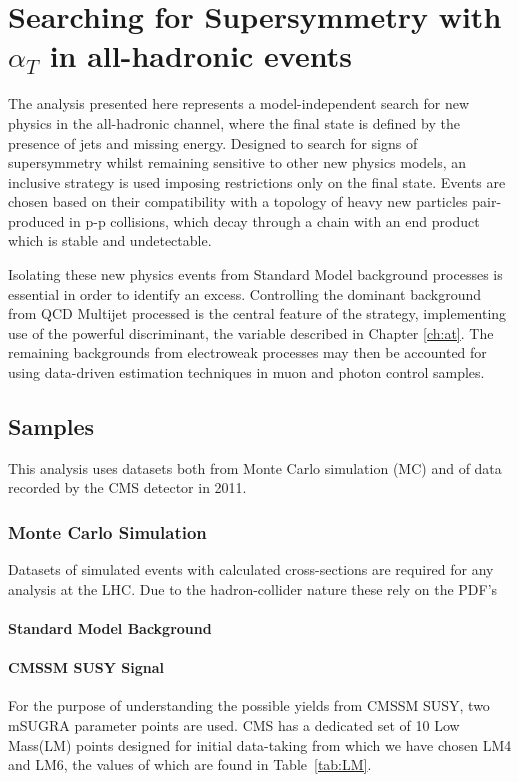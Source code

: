 \chapter{Searching for Supersymmetry with $\alpha_{T}$ in all-hadronic events}
The analysis presented here represents a model-independent search for new physics in the all-hadronic channel, where the final state is defined by the presence of jets and missing energy. Designed to search for signs of supersymmetry whilst remaining sensitive to other new physics models, an inclusive strategy is used imposing restrictions only on the final state.  Events are chosen based on their compatibility with a topology of heavy new particles pair-produced in p-p collisions, which decay through a chain with an end product which is stable and undetectable. 

Isolating these new physics events from Standard Model background processes is essential in order to identify an excess. Controlling the dominant background from QCD Multijet processed is the central feature of the strategy, implementing use of the powerful discriminant, the \alt variable described in Chapter \ref{ch:at}. The remaining backgrounds from electroweak processes may then be accounted for using data-driven estimation techniques in muon and photon control samples. 



\section{Samples}
This analysis uses datasets both from Monte Carlo simulation (MC) and of data recorded by the CMS detector in 2011.

\subsection{Monte Carlo Simulation}
Datasets of simulated events with calculated cross-sections are required for any analysis at the LHC. Due to the hadron-collider nature these rely on the PDF's 
\subsubsection{Standard Model Background}
\subsubsection{CMSSM SUSY Signal}
For the purpose of understanding the possible yields from CMSSM SUSY, two mSUGRA parameter points are used. CMS has a dedicated set of 10 Low Mass(LM) points designed for initial data-taking from which we have chosen LM4 and LM6, the values of which are found in Table~\ref{tab:LM}. 

